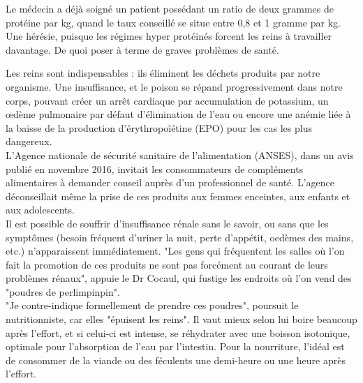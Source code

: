 \documentclass[8pt]{article}
\begin{document}
Le médecin a déjà soigné un patient possédant un ratio de deux grammes de protéine par kg, quand le taux conseillé se situe entre 0,8 et 1 gramme par kg. Une hérésie, puisque les régimes hyper protéinés forcent les reins à travailler davantage. De quoi poser à terme de graves problèmes de santé.

Les reins sont indispensables : ils éliminent les déchets produits par notre organisme. Une insuffisance, et le poison se répand progressivement dans notre corps, pouvant créer un arrêt cardiaque par accumulation de potassium, un œdème pulmonaire par défaut d’élimination de l’eau ou encore une anémie liée à la baisse de la production d’érythropoïétine (EPO) pour les cas les plus dangereux.\\

L’Agence nationale de sécurité sanitaire de l’alimentation (ANSES), dans un avis publié en novembre 2016, invitait les consommateurs de compléments alimentaires à demander conseil auprès d’un professionnel de santé. L’agence déconseillait même la prise de ces produits aux femmes enceintes, aux enfants et aux adolescents.\\

Il est possible de souffrir d’insuffisance rénale sans le savoir, ou sans que les symptômes (besoin fréquent d’uriner la nuit, perte d’appétit, oedèmes des mains, etc.) n’apparaissent immédiatement. "Les gens qui fréquentent les salles où l’on fait la promotion de ces produits ne sont pas forcément au courant de leurs problèmes rénaux", appuie le Dr Cocaul, qui fustige les endroits où l’on vend des "poudres de perlimpinpin". \\

"Je contre-indique formellement de prendre ces poudres", poursuit le nutritionniste, car elles "épuisent les reins". Il vaut mieux selon lui boire beaucoup après l’effort, et si celui-ci est intense, se réhydrater avec une boisson isotonique, optimale pour l’absorption de l’eau par l’intestin. Pour la nourriture, l’idéal est de consommer de la viande ou des féculents une demi-heure ou une heure après l’effort.


\newpage
\end{document}
